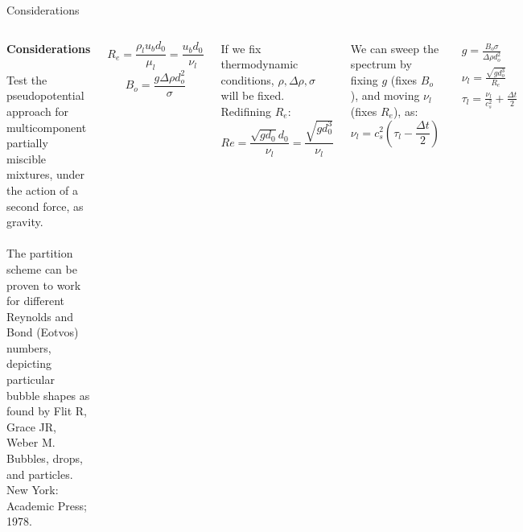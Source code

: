\documentclass[8pt]{beamer}
\begin{document}
	\begin{frame}[t]{Considerations}
		\justifying
		
		
		\begin{columns}[t]
			
			\textbf{Considerations}\\~\\
			\justifying
			Test the pseudopotential approach for multicomponent partially miscible mixtures, under the action of a second force, as gravity.\\~\\
			
			The partition scheme can be proven to work for different Reynolds and Bond (Eotvos) numbers, depicting particular bubble shapes as found by Flit R, Grace JR, Weber M. Bubbles, drops, and particles. New York: Academic Press; 1978. 
			
			\begin{equation*}
			R_e = \frac{\rho_l u_b d_0}{\mu_l} = \frac{u_b d_0}{\nu_l}
			\end{equation*}
			\begin{equation*}
			B_o = \frac{g \Delta \rho d_o^2}{\sigma}
			\end{equation*}
			
			
			If we fix thermodynamic conditions, $\rho, \Delta \rho, \sigma$ will be fixed. Redifining $R_e$:
			\begin{equation*}
				Re = \frac{\sqrt{g d_0} d_0}{\nu_l} =  \frac{\sqrt{g d_0^3}}{\nu_l}
			\end{equation*}
			
			We can sweep the spectrum by fixing $g$ (fixes $B_o$), and moving $\nu_l$ (fixes $R_e$), as:
			\begin{equation*}
				\nu_l = c_s^2 (\tau_l - \frac{\Delta t}{2})
			\end{equation*}
				
			\begin{equation*}
				\begin{split}
					g = \frac{B_o \sigma}{\Delta \rho d_o^2}\\
					\nu_l = \frac{\sqrt{g d_o^3}}{R_e}\\
					\tau_l = \frac{\nu_l}{c_s^2}+ \frac{\Delta t}{2}
				\end{split}
			\end{equation*}
		\end{columns}
	\end{frame}
	
\end{document}
